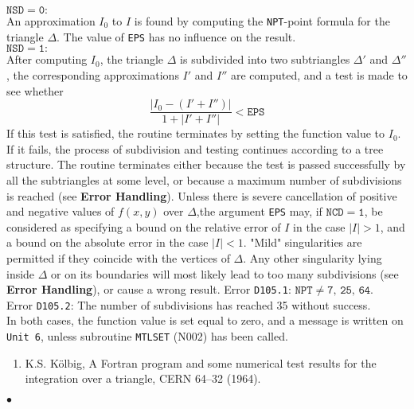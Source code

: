 \newpage
\Method
$\mathtt{NSD = 0:}$ \\
An approximation $I_0 $ to $I$ is found by computing the {\tt NPT}-point
formula for the triangle $\Delta$. The value of {\tt EPS} has no
influence on the result.\\
$\mathtt{NSD = 1:}$ \\
After computing $ I_0 $, the triangle $\Delta$ is subdivided into two
subtriangles $\Delta'$ and $\Delta''$, the corresponding
approximations $I'$ and $I''$ are computed, and a test is made to
see whether
$$ \frac{|I_0-(I'+I'')|}{1+|I'+I''|} < \mathtt{EPS}  $$
If this test is satisfied, the routine terminates by setting the
function value to $I_0$. If it fails, the process of subdivision and
testing continues according to a tree structure. The routine
terminates either because the test is passed successfully by all the
subtriangles at some level, or because a maximum number of subdivisions
is reached (see {\bf Error Handling}).
\Accuracy
Unless  there is severe cancellation  of positive and negative
values of $f(x,y)$ over $\Delta$,the argument {\tt EPS} may,
if $\mathtt{NCD = 1}$, be considered as specifying a bound on the
relative error of $I$ in the case $ |I|>1$,
and a bound on the absolute error in the case $ |I|<1$.
\Restrict
"Mild" singularities are permitted if they coincide with the
vertices of $\Delta$. Any other singularity lying inside $\Delta$ or on
its boundaries will most likely lead to too many subdivisions (see
{\bf Error Handling}), or cause a wrong result.
\Errorh
Error {\tt D105.1}: $\mathtt{NPT \ne 7,\,25,\,64}$. \\
Error {\tt D105.2}: The number of subdivisions has reached 35 without
success. \\
In both cases,
the function value is set equal to zero, and a message is written on
{\tt Unit 6}, unless subroutine {\tt MTLSET} (N002) has been called.
\Refer
\begin{enumerate}
\item K.S. K\"olbig, A Fortran program and some numerical
test results for the integration over a triangle, CERN 64--32 (1964).
\end{enumerate}
$\bullet$
